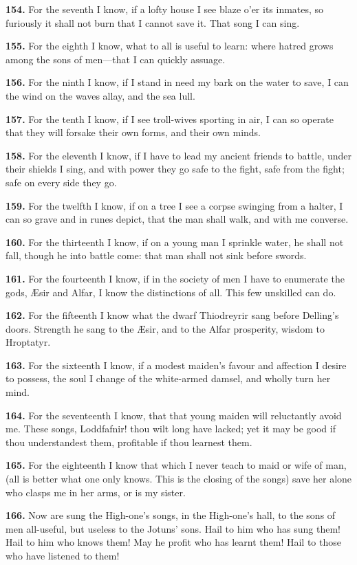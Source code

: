 \textbf{154.} For the seventh I know, if a lofty house I see blaze o'er its
inmates, so furiously it shall not burn that I cannot save it. That
song I can sing.

\textbf{155.} For the eighth I know, what to all is useful to learn: where
hatred grows among the sons of men—that I can quickly assuage.

\textbf{156.} For the ninth I know, if I stand in need my bark on the water
to save, I can the wind on the waves allay, and the sea lull.

\textbf{157.} For the tenth I know, if I see troll-wives sporting in air, I
can so operate that they will forsake their own forms, and their own
minds.

\textbf{158.} For the eleventh I know, if I have to lead my ancient friends
to battle, under their shields I sing, and with power they go safe to
the fight, safe from the fight; safe on every side they go.

\textbf{159.} For the twelfth I know, if on a tree I see a corpse swinging
from a halter, I can so grave and in runes depict, that the man shall
walk, and with me converse.

\textbf{160.} For the thirteenth I know, if on a young man I sprinkle water,
he shall not fall, though he into battle come: that man shall not sink
before swords.

\textbf{161.} For the fourteenth I know, if in the society of men I have to
enumerate the gods, Æsir and Alfar, I know the distinctions of all.
This few unskilled can do.

\textbf{162.} For the fifteenth I know what the dwarf Thiodreyrir sang before
Delling's doors. Strength he sang to the Æsir, and to the Alfar
prosperity, wisdom to Hroptatyr.

\textbf{163.} For the sixteenth I know, if a modest maiden's favour and
affection I desire to possess, the soul I change of the white-armed
damsel, and wholly turn her mind.

\textbf{164.} For the seventeenth I know, that that young maiden will
reluctantly avoid me. These songs, Loddfafnir! thou wilt long have
lacked; yet it may be good if thou understandest them, profitable if
thou learnest them.

\textbf{165.} For the eighteenth I know that which I never teach to maid or
wife of man, (all is better what one only knows. This is the closing
of the songs) save her alone who clasps me in her arms, or is my
sister.

\textbf{166.} Now are sung the High-one's songs, in the High-one's hall, to
the sons of men all-useful, but useless to the Jotuns' sons. Hail to
him who has sung them! Hail to him who knows them! May he profit who
has learnt them! Hail to those who have listened to them!

